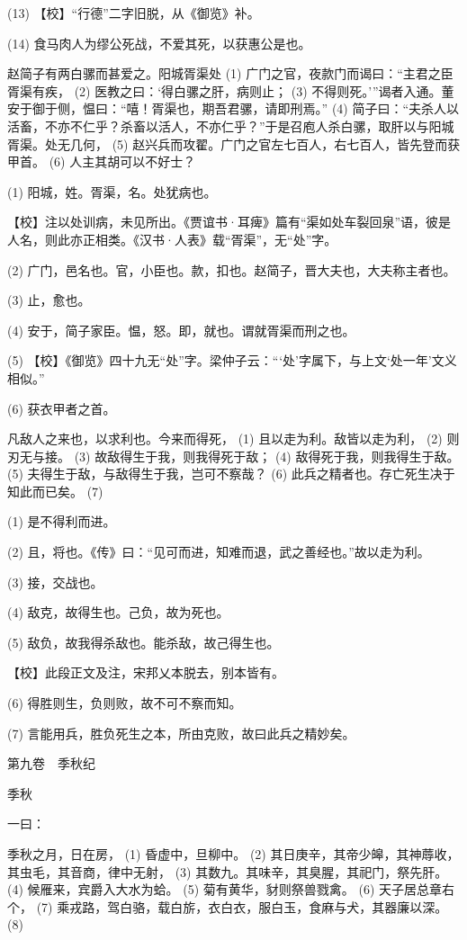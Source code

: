 \documentclass[12pt,UTF8]{ctexbook}
\begin{document}
(13) 【校】“行德”二字旧脱，从《御览》补。

(14) 食马肉人为缪公死战，不爱其死，以获惠公是也。

赵简子有两白骡而甚爱之。阳城胥渠处 (1) 广门之官，夜款门而谒曰：“主君之臣胥渠有疾， (2) 医教之曰：‘得白骡之肝，病则止； (3) 不得则死。’”谒者入通。董安于御于侧，愠曰：“嘻！胥渠也，期吾君骡，请即刑焉。” (4) 简子曰：“夫杀人以活畜，不亦不仁乎？杀畜以活人，不亦仁乎？”于是召庖人杀白骡，取肝以与阳城胥渠。处无几何， (5) 赵兴兵而攻翟。广门之官左七百人，右七百人，皆先登而获甲首。 (6) 人主其胡可以不好士？

(1) 阳城，姓。胥渠，名。处犹病也。

【校】注以处训病，未见所出。《贾谊书·耳痺》篇有“渠如处车裂回泉”语，彼是人名，则此亦正相类。《汉书·人表》载“胥渠”，无“处”字。

(2) 广门，邑名也。官，小臣也。款，扣也。赵简子，晋大夫也，大夫称主者也。

(3) 止，愈也。

(4) 安于，简子家臣。愠，怒。即，就也。谓就胥渠而刑之也。

(5) 【校】《御览》四十九无“处”字。梁仲子云：“‘处’字属下，与上文‘处一年’文义相似。”

(6) 获衣甲者之首。

凡敌人之来也，以求利也。今来而得死， (1) 且以走为利。敌皆以走为利， (2) 则刃无与接。 (3) 故敌得生于我，则我得死于敌； (4) 敌得死于我，则我得生于敌。 (5) 夫得生于敌，与敌得生于我，岂可不察哉？ (6) 此兵之精者也。存亡死生决于知此而已矣。 (7)

(1) 是不得利而进。

(2) 且，将也。《传》曰：“见可而进，知难而退，武之善经也。”故以走为利。

(3) 接，交战也。

(4) 敌克，故得生也。己负，故为死也。

(5) 敌负，故我得杀敌也。能杀敌，故己得生也。

【校】此段正文及注，宋邦乂本脱去，别本皆有。

(6) 得胜则生，负则败，故不可不察而知。

(7) 言能用兵，胜负死生之本，所由克败，故曰此兵之精妙矣。





第九卷　季秋纪



季秋


一曰：

季秋之月，日在房， (1) 昏虚中，旦柳中。 (2) 其日庚辛，其帝少皞，其神蓐收，其虫毛，其音商，律中无射， (3) 其数九。其味辛，其臭腥，其祀门，祭先肝。 (4) 候雁来，宾爵入大水为蛤。 (5) 菊有黄华，豺则祭兽戮禽。 (6) 天子居总章右个， (7) 乘戎路，驾白骆，载白旂，衣白衣，服白玉，食麻与犬，其器廉以深。 (8)
\end{document}
